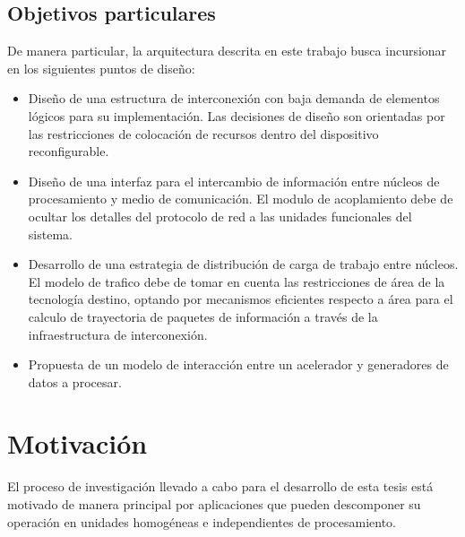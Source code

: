 	\subsection{Objetivos particulares}
		\label{objetivos_particulares}
		De manera particular, la arquitectura descrita en este trabajo busca incursionar en los siguientes puntos de diseño:

		\begin{itemize}

			\item 	Diseño de una estructura de interconexión con baja demanda de elementos lógicos para su implementación. Las decisiones de diseño son orientadas por las restricciones de colocación de recursos dentro del dispositivo reconfigurable.

			\item 	Diseño de una interfaz para el intercambio de información entre núcleos de procesamiento y medio de comunicación. El modulo de acoplamiento debe de ocultar los detalles del protocolo de red a las unidades funcionales del sistema.

			\item 	Desarrollo de una estrategia de distribución de carga de trabajo entre núcleos. El modelo de trafico debe de tomar en cuenta las restricciones de área de la tecnología destino, optando por mecanismos eficientes respecto a área para el calculo de trayectoria de paquetes de información a través de la infraestructura de interconexión.  

			\item 	Propuesta de un modelo de interacción entre un acelerador y generadores de datos a procesar.

		\end{itemize}


\section{Motivación}
	\label{motivacion}

	El proceso de investigación llevado a cabo para el desarrollo de esta tesis está motivado de manera principal por aplicaciones que pueden descomponer su operación en unidades homogéneas e independientes de procesamiento.

